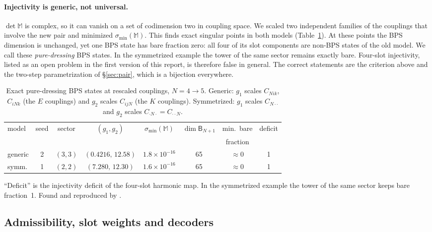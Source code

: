 \documentclass[11pt]{article}
\newcommand{\B}{\mathsf B}
\newcommand{\Mb}{\mathbb M}
\theoremstyle{plain}
\theoremstyle{remark}
\numberwithin{equation}{section}
\begin{document}
\paragraph{Injectivity is generic, not universal.} $\det\Mb$ is complex, so it can vanish on a set of codimension two in
coupling space. We scaled two independent families of the couplings that involve the new pair and minimized
$\sigma_{\min}(\Mb)$. This finds exact singular points in both models (Table~\ref{tab:pure}). At these points the BPS
dimension is unchanged, yet one BPS state has bare fraction zero: all four of its slot components are non-BPS states of
the old model. We call these \emph{pure-dressing} BPS states. In the symmetrized example the tower of the same sector
remains exactly bare. Four-slot injectivity, listed as an open problem in the first version of this report, is therefore
false in general. The correct statements are the criterion above and the two-step parametrization of
\S\ref{sec:pair}, which is a bijection everywhere.

\begin{table}[ht]
\centering\small
\caption{Exact pure-dressing BPS states at rescaled couplings, $N=4\to5$.
Generic: $g_1$ scales $C_{N i k}$, $C_{i N k}$ (the $E$ couplings) and $g_2$ scales $C_{ijN}$ (the $K$ couplings).
Symmetrized: $g_1$ scales $C_{N\cdot\cdot}$ and $g_2$ scales $C_{\cdot N\cdot}=C_{\cdot\cdot N}$.}\label{tab:pure}
\begin{tabular}{@{}lccccccc@{}}\toprule
model & seed & sector & $(g_1,g_2)$ & $\sigma_{\min}(\Mb)$ & $\dim\B_{N+1}$ & min.\ bare & deficit\\
 & & & & & & fraction & \\\midrule
generic & 2 & $(3,3)$ & $(0.4216,\,12.58)$ & $1.8\times10^{-16}$ & 65 & $\approx0$ & 1\\
symm. & 1 & $(2,2)$ & $(7.280,\,12.30)$ & $1.6\times10^{-16}$ & 65 & $\approx0$ & 1\\\bottomrule
\end{tabular}

\smallskip
{\small ``Deficit'' is the injectivity deficit of the four-slot harmonic map. In the symmetrized example the tower of
the same sector keeps bare fraction~1. Found and reproduced by .}
\end{table}

\subsection{Admissibility, slot weights and decoders}
\end{document}
